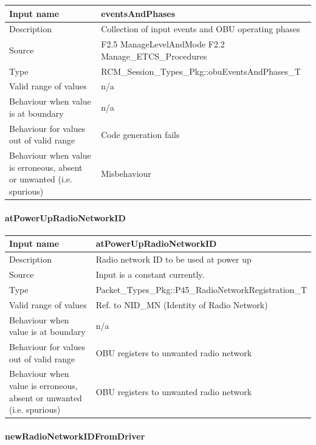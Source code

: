 \begin{longtable}{p{}p{}}
	\toprule
	Input name				& eventsAndPhases \\
	\midrule
	Description				& Collection of input events and OBU operating phases \\
	\midrule
	Source					& F2.5 ManageLevelAndMode\newline
	F2.2 Manage\_ETCS\_Procedures \\ 
	\midrule
	Type					& RCM\_Session\_Types\_Pkg::obuEventsAndPhases\_T \\
	\midrule
	Valid range of values	& n/a \\
	\midrule
	Behaviour when value is at boundary	& n/a \\
	\midrule
	Behaviour for values out of valid range	& Code generation fails \\
	\midrule
	Behaviour when value is erroneous, absent or unwanted (i.e. spurious) & Misbehaviour \\
	\bottomrule
\end{longtable}

\paragraph{atPowerUpRadioNetworkID}

\begin{longtable}{p{}p{}}
	\toprule
	Input name				& atPowerUpRadioNetworkID \\
	\midrule
	Description				& Radio network ID to be used at power up \\
	\midrule
	Source					& Input is a constant currently. \\ 
	\midrule
	Type					& Packet\_Types\_Pkg::P45\_RadioNetworkRegistration\_T \\
	\midrule
	Valid range of values	& Ref. to NID\_MN (Identity of Radio Network)  \\
	\midrule
	Behaviour when value is at boundary	& n/a \\
	\midrule
	Behaviour for values out of valid range	& OBU registers to unwanted radio network \\
	\midrule
	Behaviour when value is erroneous, absent or unwanted (i.e. spurious) & OBU registers to unwanted radio network  \\
	\bottomrule
\end{longtable}

\paragraph{newRadioNetworkIDFromDriver}

